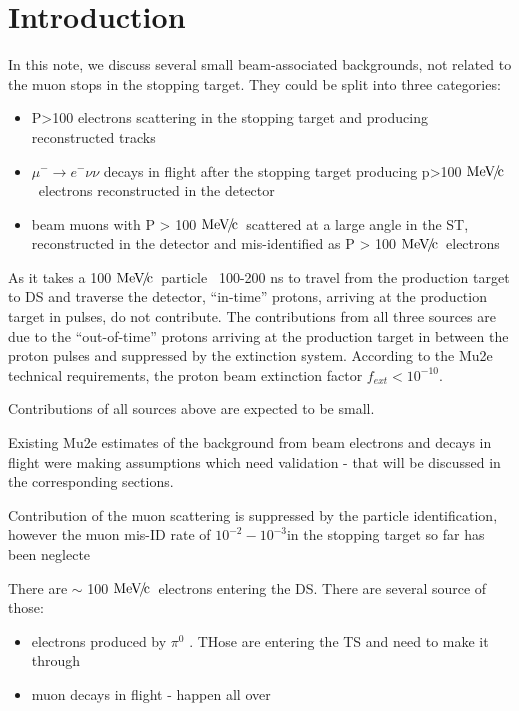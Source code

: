 \documentclass[12pt]{article}
\newcommand {\MeVc}       {\mbox{$\rm MeV\!/\!c$}}
\newcommand {\ra}        {\rightarrow}
\begin{document}
\section {Introduction}

In this note, we discuss several small beam-associated backgrounds, not related to
the muon stops in the stopping target. They could be split into three categories:

\begin{itemize}
\item 
  P>100 electrons scattering in the stopping target and producing reconstructed tracks
\item
  $\mu^- \ra e^- \nu \nu$ decays in flight after the stopping target producing p>100 \MeVc\
  electrons reconstructed in the detector
\item
  beam muons with P > 100 \MeVc\ scattered at a large angle in the ST, reconstructed in the detector
  and mis-identified as P > 100 \MeVc\ electrons 
\end{itemize}

As it takes a 100 \MeVc\ particle ~100-200 ns to travel from the production target to DS and
traverse the detector, ``in-time'' protons, arriving at the production target in pulses, 
do not contribute. The contributions from all three sources are due to the ``out-of-time''
protons arriving at the production target in between the proton pulses and suppressed by the
extinction system. According to the Mu2e technical requirements, the proton beam extinction
factor $f_{ext} < 10^{-10}$.

Contributions of all sources above are expected to be small.

Existing Mu2e estimates of the background from beam electrons and decays in flight
were making assumptions which need validation - that will be discussed in the corresponding sections.

Contribution of the muon scattering is suppressed by the particle identification, however the
muon mis-ID rate of $10^{-2} - 10^{-3} $in the stopping target so far has been neglecte

There are $\sim$ 100 \MeVc\ electrons entering the DS. There are several source of those:
\begin{itemize}
\item
  electrons produced by $\pi^0$ . THose are entering the TS and need to make it through
\item
  muon decays in flight - happen all over
\end{itemize}
\end{document}
